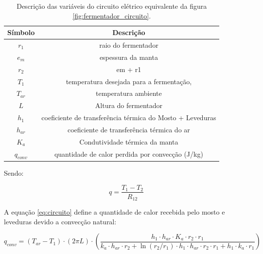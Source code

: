 \begin{table}[H]
    \begin{center}
        \begin{tabular}{ |c|c| } 
            \hline
            Símbolo   &  Descrição  \\
            \hline
            \(r_1\)   &  raio do fermentador  \\
            \hline
            \(e_m\) &  espessura da manta \\
            \hline
            \(r_2\)   &  em + r1   \\
            \hline
            \(T_1\)  &  temperatura desejada para a fermentação, \\
            \hline
            \(T_{ar}\) &  temperatura ambiente  \\
            \hline
            \(L\)    &  Altura do fermentador  \\
            \hline
            \(h_1\)  &  coeficiente de transferência térmica do Mosto + Leveduras  \\
            \hline
            \(h_{ar}\) &  coeficiente de transferência térmica do ar \\
            \hline
            \(K_a\) & Condutividade térmica da manta  \\
            \hline
            \(q_{conv}\) & quantidade de calor perdida por convecção (J/kg) \\
            \hline
        \end{tabular}
        \caption{\label{tab:variaveis_circuito}Descrição das variáveis do circuito elétrico equivalente da figura \ref{fig:fermentador_circuito}.}
    \end{center}
\end{table}

Sendo:

\begin{equation}
    q = \dfrac{T_1 - T_2}{R_{12}}
\end{equation}


A equação \ref{eq:circuito} define a quantidade de calor recebida pelo mosto e leveduras devido a convecção natural:  


\begin{equation}
    q_{conv} = (T_{ar} - T_1) \cdot (2 \pi L) \cdot (\dfrac{h_1 \cdot h_{ar} \cdot K_a \cdot r_2 \cdot r_1}{k_a \cdot h_{ar} \cdot r_2 + \ln(r_2/r_1) \cdot h_1 \cdot h_{ar} \cdot r_2 \cdot r_1 + h_1 \cdot k_a \cdot r_1})
    \label{eq:circuito}
\end{equation}

